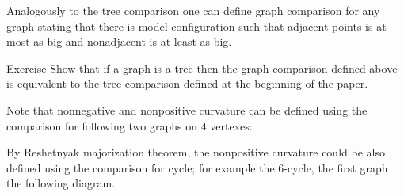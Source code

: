 Analogously to the tree comparison one can define graph comparison for any graph stating that there is model configuration such that adjacent points is at most as big and nonadjacent is at least as big.

\begin{thm}{Exercise}
Show that if a graph is a tree then the graph comparison defined above is equivalent to the tree comparison defined at the beginning of the paper.
\end{thm}


Note that nonnegative and nonpositive curvature can be defined using the comparison for following two graphs on 4 vertexes:

\hide
\begin{center}
\hskip30mm
\end{center}
\unhide

By Reshetnyak majorization theorem,
the nonpositive curvature could be also defined using the comparison for cycle; for example the 6-cycle, the first graph the following diagram.

